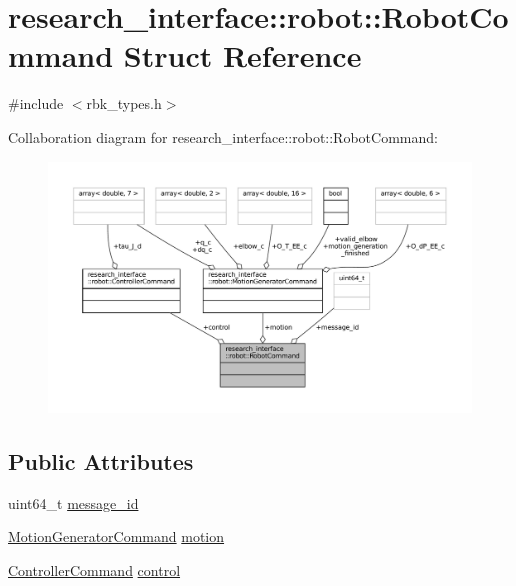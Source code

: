 \hypertarget{structresearch__interface_1_1robot_1_1RobotCommand}{}\section{research\+\_\+interface\+:\+:robot\+:\+:Robot\+Command Struct Reference}
\label{structresearch__interface_1_1robot_1_1RobotCommand}


{\ttfamily \#include $<$rbk\+\_\+types.\+h$>$}



Collaboration diagram for research\+\_\+interface\+:\+:robot\+:\+:Robot\+Command\+:
\nopagebreak
\begin{figure}[H]
\begin{center}
\leavevmode
\includegraphics[width=350pt]{structresearch__interface_1_1robot_1_1RobotCommand__coll__graph}
\end{center}
\end{figure}
\subsection*{Public Attributes}
\begin{DoxyCompactItemize}
\item 
uint64\+\_\+t \hyperlink{structresearch__interface_1_1robot_1_1RobotCommand_a0a7700d777ee45295f3c9c93c663e225}{message\+\_\+id}
\item 
\hyperlink{structresearch__interface_1_1robot_1_1MotionGeneratorCommand}{Motion\+Generator\+Command} \hyperlink{structresearch__interface_1_1robot_1_1RobotCommand_a34f8cf05244b624338e6bb56f379d863}{motion}
\item 
\hyperlink{structresearch__interface_1_1robot_1_1ControllerCommand}{Controller\+Command} \hyperlink{structresearch__interface_1_1robot_1_1RobotCommand_a54ece5287747631500173fc5c93ea32e}{control}
\end{DoxyCompactItemize}


